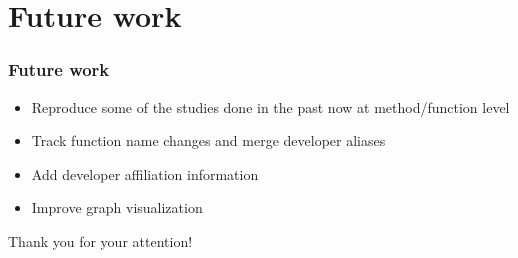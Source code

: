\documentclass{beamer}
\begin{document}
\section{Future work}

\begin{frame}
\frametitle{Future work}
\begin{itemize}
\item Reproduce some of the studies done in the past now at method/function level
\item Track function name changes and merge developer aliases
\item Add developer affiliation information
\item Improve graph visualization
\end{itemize}
\end{frame}


\begin{frame}
\Huge{\centerline{Thank you for your attention!}}
\end{frame}

\end{document}
